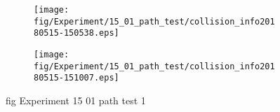 \begin{figure}[H]
	\centering
	\begin{subfigure}[b]{0.9\textwidth}
		\texttt{[image: fig/Experiment/15\_01\_path\_test/collision\_info20180515-150538.eps]}
		\caption{}
		\label{fig:Experiment:15_01_path_test:collision_info20180515-150538}
	\end{subfigure}

	\begin{subfigure}[b]{0.9\textwidth}
		\texttt{[image: fig/Experiment/15\_01\_path\_test/collision\_info20180515-151007.eps]}
		\caption{}
		\label{fig:Experiment:15_01_path_test:collision_info20180515-151007}
	\end{subfigure}
	\caption{fig Experiment 15 01 path test 1}
	\label{fig:Experiment:15_01_path_test:1}
\end{figure}

